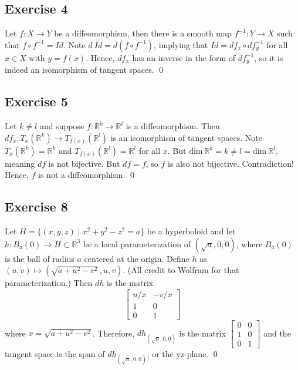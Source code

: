 \documentclass{article}
\newcommand{\R}{\mathbb{R}}
\begin{document}
\subsection*{Exercise 4}
  Let $f\colon X\to Y$ be a diffeomorphism, then there is a smooth map $f^{-1}
  \colon Y\to X$ such that $f\circ f^{-1}=Id$. Note $d\ Id=d(f\circ f^{-1})$,
  implying that $Id=df_x\circ df^{-1}_y$ for all $x\in X$ with $y=f(x)$. Hence,
  $df_x$ has an inverse in the form of $df^{-1}_y$, so it is indeed an
  isomorphism of tangent spaces.
  \qed

\subsection*{Exercise 5}
  Let $k\ne l$ and suppose $f\colon\R^k\to\R^l$ is a diffeomorphism. Then $df_x
  \colon T_x(\R^k)\to T_{f(x)}(\R^l)$ is an isomorphism of tangent spaces. Note
  $T_x(\R^k)=\R^k$ and $T_{f(x)}(\R^l)=\R^l$ for all $x$. But $\text{dim}\ \R^k=
  k\ne l=\text{dim}\ \R^l$, meaning $df$ is not bijective. But $df=f$, so $f$ is
  also not bijective. Contradiction! Hence, $f$ is not a diffeomorphism.
  \qed

\subsection*{Exercise 8}
  Let $H=\{(x,y,z)\mid x^2+y^2-z^2=a\}$ be a hyperboloid and let $h\colon B_a(0)
  \to H\subset\R^3$ be a local parameterization of $(\sqrt{a},0,0)$, where
  $B_a(0)$ is the ball of radius $a$ centered at the origin. Define $h$ as
  $(u,v)\mapsto(\sqrt{a+u^2-v^2},u,v)$. (All credit to Wolfram for that
  parameterization.) Then $dh$ is the matrix
  \begin{equation*}
    \begin{bmatrix}
      u/x &   -v/x  \\
      1   &   0     \\
      0   &   1
    \end{bmatrix}
  \end{equation*}
  where $x=\sqrt{a+u^2-v^2}$. Therefore, $dh_{(\sqrt{a},0,0)}$ is the matrix
  $\left[
    \begin{smallmatrix}
      0&0\\
      1&0\\
      0&1
    \end{smallmatrix}
  \right]$
  and the tangent space is the span of $dh_{(\sqrt{a},0,0)}$, or the yz-plane.
  \qed
\end{document}

